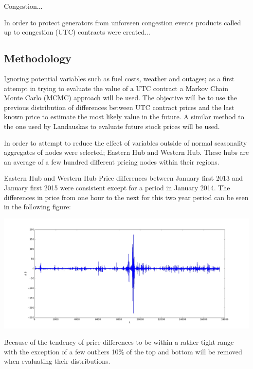 \documentclass{report}
\begin{document}
Congestion...

In order to protect generators from unforseen congestion events products called
up to congestion (UTC) contracts were created...

\subsection*{Methodology}
Ignoring potential variables such as fuel costs, weather and outages; as a first
attempt in trying to evaluate the value of a UTC contract a Markov
Chain Monte Carlo (MCMC) approach will be used. The objective will be to use the
previous distribution of differences between UTC contract prices and the last
known price to estimate the most likely value in the future. A similar method to
the one used by Landauskas \cite{landauskas} to evaluate future stock prices will
be used.

In order to attempt to reduce the effect of variables outside of normal seasonality
aggregates of nodes were selected; Eastern Hub and Western Hub. These hubs are an average
of a few hundred different pricing nodes within their regions.

Eastern Hub and Western Hub Price differences between January first 2013 and
January first 2015 were consistent except for a period in January 2014. The differences in
price from one hour to the next for this two year period can be seen in the
following figure:
\begin{center}
\includegraphics[width=500pt, keepaspectratio=true]{price_differences.jpg}\\
\end{center}
Because of the tendency of price differences to be within a rather tight range
with the exception of a few outliers 10\% of the top and bottom will be removed when
evaluating their distributions.
\end{document}
